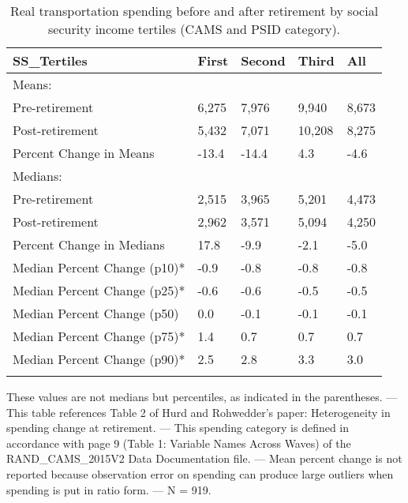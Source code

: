 \begin{table}[tbp] \centering
{}

\caption{Real transportation spending before and after retirement by social security income tertiles (CAMS and PSID category).}
\begin{tabularx}{\textwidth}{lCCCC}

\toprule
{SS\_Tertiles}&{First}&{Second}&{Third}&{All} \tabularnewline
\midrule\addlinespace[1.5ex]
Means:&&&& \tabularnewline
\midrule Pre-retirement&6,275&7,976&9,940&8,673 \tabularnewline
Post-retirement&5,432&7,071&10,208&8,275 \tabularnewline
Percent Change in Means&-13.4&-14.4&4.3&-4.6 \tabularnewline
\midrule Medians:&&&& \tabularnewline
\midrule Pre-retirement&2,515&3,965&5,201&4,473 \tabularnewline
Post-retirement&2,962&3,571&5,094&4,250 \tabularnewline
Percent Change in Medians&17.8&-9.9&-2.1&-5.0 \tabularnewline
Median Percent Change (p10)*&-0.9&-0.8&-0.8&-0.8 \tabularnewline
Median Percent Change (p25)*&-0.6&-0.6&-0.5&-0.5 \tabularnewline
Median Percent Change (p50)&0.0&-0.1&-0.1&-0.1 \tabularnewline
Median Percent Change (p75)*&1.4&0.7&0.7&0.7 \tabularnewline
Median Percent Change (p90)*&2.5&2.8&3.3&3.0 \tabularnewline
\bottomrule \addlinespace[1.5ex]

\end{tabularx}
\begin{flushleft}
\footnotesize *These values are not medians but percentiles, as indicated in the parentheses. \linebreak --- \linebreak This table references Table 2 of Hurd and Rohwedder's paper: Heterogeneity in spending change at retirement. \linebreak --- \linebreak This spending category is defined in accordance with page 9 (Table 1: Variable Names Across Waves) of the RAND\_CAMS\_2015V2 Data Documentation file. \linebreak --- \linebreak Mean percent change is not reported because observation error on spending can produce large outliers when spending is put in ratio form. \linebreak --- \linebreak N = 919.
\end{flushleft}
\end{table}
